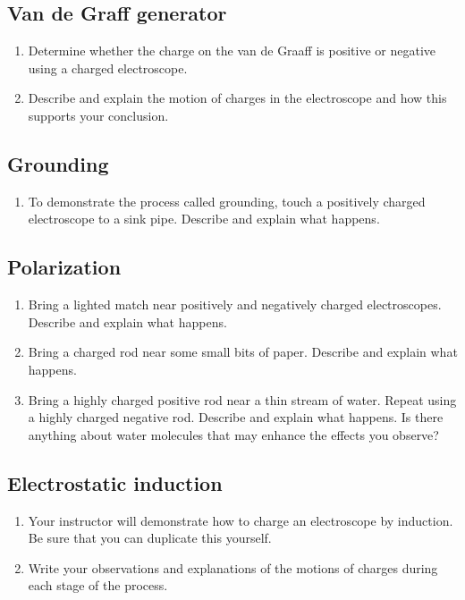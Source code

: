 \subsection{Van de Graff generator}
\begin{enumerate}[resume]
	 \item Determine whether the charge on the van de Graaff is positive or negative using a charged electroscope.  
	 \item Describe and explain the motion of charges in the electroscope and how this supports your conclusion.
\end{enumerate}

\subsection{Grounding}
\begin{enumerate}[resume]
 \item To demonstrate the process called grounding, touch a positively charged electroscope to a sink pipe.  Describe and explain what happens.
\end{enumerate}

\subsection{Polarization}
\begin{enumerate}[resume]
	\item Bring a lighted match near positively and negatively charged electroscopes. Describe and explain what happens.
	\item Bring a charged rod near some small bits of paper.  Describe and explain what happens.
	\item Bring a highly charged positive rod near a thin stream of water.  Repeat using a highly charged negative rod.  Describe and explain what happens. Is there anything about water molecules that may enhance the effects you observe?
\end{enumerate}

\subsection{Electrostatic induction}
\begin{enumerate}[resume]
	 \item Your instructor will demonstrate how to charge an electroscope by induction.  Be sure that you can duplicate this yourself. 
	 \item Write your observations and explanations of the motions of charges during each stage of the process.
\end{enumerate}
 
